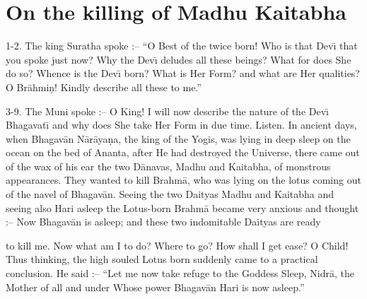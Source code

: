 \chapter{On the killing of Madhu Kaitabha}

1-2. The king Suratha spoke :-- ``O Best of the twice born! Who is that Dev\={\i} that you spoke just now? Why the Dev\={\i} deludes all these beings? What for does She do so? Whence is the Dev\={\i} born? What is Her Form? and what are Her qualities? O Br\=ahmi\d{n}! Kindly describe all these to me.''

3-9. The Muni spoke :-- O King! I will now describe the nature of the Dev\={\i} Bhagavat\={\i} and why does She take Her Form in due time. Listen. In ancient days, when Bhagav\=an N\=ar\=aya\d{n}a, the king of the Yogis, was lying in deep sleep on the ocean on the bed of Ananta, after He had destroyed the Universe, there came out of the wax of his ear the two D\=anavas, Madhu and Kaitabha, of monstrous appearances. They wanted to kill Brahm\=a, who was lying on the lotus coming out of the navel of Bhagav\=an. Seeing the two Daityas Madhu and Kaitabha and seeing also Hari asleep the Lotus-born Brahm\=a became very anxious and thought :-- Now Bhagav\=an is asleep; and these two indomitable Daityas are ready

to kill me. Now what am I to do? Where to go? How shall I get ease? O Child! Thus thinking, the high souled Lotus born suddenly came to a practical conclusion. He said :-- ``Let me now take refuge to the Goddess Sleep, Nidr\=a, the Mother of all and under Whose power Bhagav\=an Hari is now asleep.''

